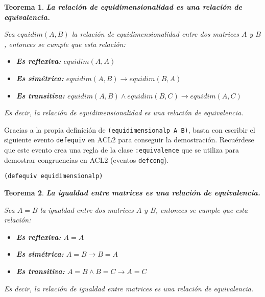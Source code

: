 \documentclass[a4paper,10pt]{article}
\newtheorem{teor}{{Teorema}}
\begin{document}
\par \vspace{16pt}

\begin{teor} \textbf{La relación de equidimensionalidad es una relación de equivalencia.}\vspace{8pt}\par
Sea $equidim(A, B)$ la relación de equidimensionalidad entre dos matrices $A$ y $B$, entonces se cumple que esta relación:
\begin{itemize}
	\item \textbf{Es reflexiva:} $equidim(A,A)$
	\item \textbf{Es simétrica:} $equidim(A,B)\rightarrow equidim(B,A)$
	\item \textbf{Es transitiva:} $equidim(A,B)\wedge equidim(B,C)\rightarrow equidim(A,C)$
\end{itemize}
\par
Es decir, la relación de equidimensionalidad es una \emph{relación de equivalencia}.
\end{teor}

\par \vspace{10pt}

Gracias a la propia definición de \texttt{(equidimensionalp A B)}, basta con escribir el siguiente evento \texttt{defequiv} en ACL2 para conseguir la demostración. Recuérdese que este evento crea una regla de la clase \texttt{:equivalence} que se utiliza para demostrar congruencias en ACL2 (eventos \texttt{defcong}). 

\par \vspace{10pt}

\begin{lstlisting}[language=clips]
(defequiv equidimensionalp)
\end{lstlisting}

\par \vspace{16pt}

\begin{teor} \textbf{La igualdad entre matrices es una relación de equivalencia.}\vspace{8pt}\par
Sea $A = B$ la igualdad entre dos matrices $A$ y $B$, entonces se cumple que esta relación:
\begin{itemize}
	\item \textbf{Es reflexiva:} $A=A$
	\item \textbf{Es simétrica:} $A = B\rightarrow B = A$
	\item \textbf{Es transitiva:} $A = B\wedge B = C\rightarrow A = C$
\end{itemize}
\par
Es decir, la relación de igualdad entre matrices es una \emph{relación de equivalencia}.
\end{teor}
\end{document}
